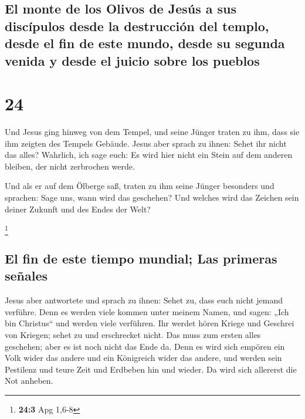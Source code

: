\hypertarget{el-monte-de-los-olivos-de-jesuxfas-a-sus-discuxedpulos-desde-la-destrucciuxf3n-del-templo-desde-el-fin-de-este-mundo-desde-su-segunda-venida-y-desde-el-juicio-sobre-los-pueblos}{%
\subsection{El monte de los Olivos de Jesús a sus discípulos desde la
destrucción del templo, desde el fin de este mundo, desde su segunda
venida y desde el juicio sobre los
pueblos}\label{el-monte-de-los-olivos-de-jesuxfas-a-sus-discuxedpulos-desde-la-destrucciuxf3n-del-templo-desde-el-fin-de-este-mundo-desde-su-segunda-venida-y-desde-el-juicio-sobre-los-pueblos}}

\hypertarget{section-23}{%
\section{24}\label{section-23}}

 Und Jesus ging hinweg von dem Tempel, und seine Jünger
traten zu ihm, dass sie ihm zeigten des Tempels Gebäude. 
Jesus aber sprach zu ihnen: Sehet ihr nicht das alles? Wahrlich, ich
sage euch: Es wird hier nicht ein Stein auf dem anderen bleiben, der
nicht zerbrochen werde.

 Und als er auf dem Ölberge saß, traten zu ihm seine
Jünger besonders und sprachen: Sage uns, wann wird das geschehen? Und
welches wird das Zeichen sein deiner Zukunft und des Endes der Welt?

\footnote{\textbf{24:3} Apg 1,6-8}

\hypertarget{el-fin-de-este-tiempo-mundial-las-primeras-seuxf1ales}{%
\subsection{El fin de este tiempo mundial; Las primeras
señales}\label{el-fin-de-este-tiempo-mundial-las-primeras-seuxf1ales}}

 Jesus aber antwortete und sprach zu ihnen: Sehet zu, dass
euch nicht jemand verführe.  Denn es werden viele kommen
unter meinem Namen, und sagen: „Ich bin Christus`` und werden viele
verführen.  Ihr werdet hören Kriege und Geschrei von
Kriegen; sehet zu und erschrecket nicht. Das muss zum ersten alles
geschehen; aber es ist noch nicht das Ende da.  Denn es
wird sich empören ein Volk wider das andere und ein Königreich wider das
andere, und werden sein Pestilenz und teure Zeit und Erdbeben hin und
wieder.  Da wird sich allererst die Not anheben.

